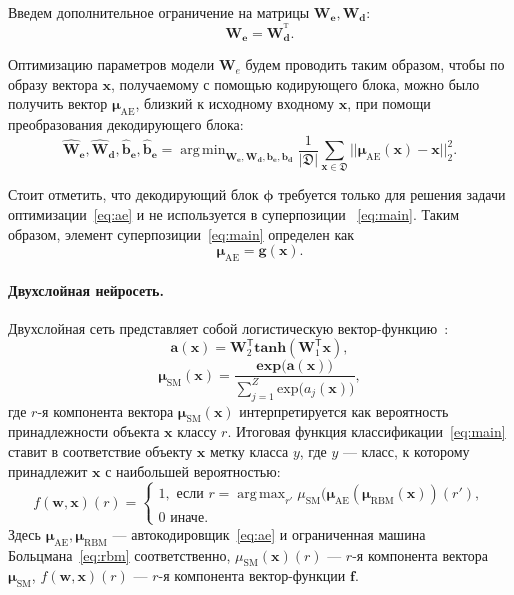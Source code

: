 \documentclass[12pt]{article}
\DeclareMathOperator*{\argmin}{arg\,min}
\DeclareMathOperator*{\argmax}{arg\,max}
\begin{document}
Введем дополнительное ограничение на матрицы $\mathbf{W}_\textbf{e}, \mathbf{W}_\textbf{d}$:
\[
 \mathbf{W}_\textbf{e} = \mathbf{W}_\textbf{d}^{^\text{T}}.
\]

Оптимизацию параметров модели $\mathbf{W}_e$ будем проводить таким образом, чтобы по образу вектора $\mathbf{x}$, получаемому с помощью кодирующего блока, можно было получить вектор $\mathbf{\boldsymbol{\mu}}_\text{AE}$, близкий к исходному входному $\mathbf{x}$, при помощи преобразования декодирующего блока:
\begin{equation}
\label{eq:ae}
 {\hat{\mathbf{W}}}_\textbf{e},\hat{\mathbf{W}}_\textbf{d},\hat{\mathbf{b}}_\textbf{e}, \hat{\mathbf{b}}_\textbf{e} = \argmin_{{\mathbf{W}}_\textbf{e},{\mathbf{W}}_\textbf{d},{\mathbf{b}}_\textbf{e}, {\mathbf{b}}_\textbf{d}} \frac{1}{|\mathfrak{D}|}\sum_{\mathbf{x} \in \mathfrak{D}} ||\mathbf{\boldsymbol{\mu}}_\text{AE}(\mathbf{x})-\mathbf{x}||^2_2.
\end{equation}

Стоит отметить, что декодирующий блок $\boldsymbol{\phi}$ требуется только для решения задачи оптимизации~\eqref{eq:ae} и не используется в суперпозиции ~\eqref{eq:main}. Таким образом, элемент суперпозиции~\eqref{eq:main} определен как
\[
	\mathbf{\boldsymbol{\mu}}_\text{AE} = \mathbf{g}(\mathbf{x}).
\]
\paragraph{Двухслойная нейросеть.}
Двухслойная сеть представляет собой логистическую вектор-функцию~\cite{sm}:
\begin{equation}
\label{sm}
 \mathbf{a}(\mathbf{x}) = \mathbf{W}^\mathsf{T}_2 \textbf{tanh}(\mathbf{W}^\mathsf{T}_1 \mathbf{x}),
\end{equation}
\[
 \mathbf{\boldsymbol{\mu}}_\text{SM}(\mathbf{x}) = \frac{\textbf{exp}\bigl(\mathbf{a}(\mathbf{x})\bigr)}{\sum_{j=1}^Z \text{exp}\bigl({a}_j(\mathbf{x})\bigr)},
\]
где $r$-я компонента вектора $\mathbf{\boldsymbol{\mu}}_\text{SM}(\mathbf{x})$ интерпретируется как вероятность принадлежности объекта $\mathbf{x}$ классу $r$. Итоговая функция классификации~\eqref{eq:main} ставит в соответствие  объекту $\mathbf{x}$ метку класса $y$, где $y$ --- класс, к которому принадлежит $\mathbf{x}$ с наибольшей вероятностью:
$$
 f(\mathbf{w},\mathbf{x})(r) = \begin{cases}
  1,\text{ если }r = \argmax_{r'} {\mu}_\text{SM}(\mathbf{\boldsymbol{\mu}}_\text{AE}(\mathbf{\boldsymbol{\mu}}_\text{RBM}(\mathbf{x}))(r'),\\
  0 \text{ иначе.}
	\end{cases}
$$
Здесь $\mathbf{\boldsymbol{\mu}}_\text{AE}, \mathbf{\boldsymbol{\mu}}_\text{RBM}$ --- автокодировщик~\eqref{eq:ae} и ограниченная машина Больцмана~\eqref{eq:rbm} соответственно, ${\mu}_\text{SM}(\mathbf{x})(r)$ --- $r$-я компонента вектора $ \mathbf{\boldsymbol{\mu}}_\text{SM}$, $f(\mathbf{w},\mathbf{x})(r)$ --- $r$-я компонента вектор-функции $\mathbf{f}$.
\end{document}
